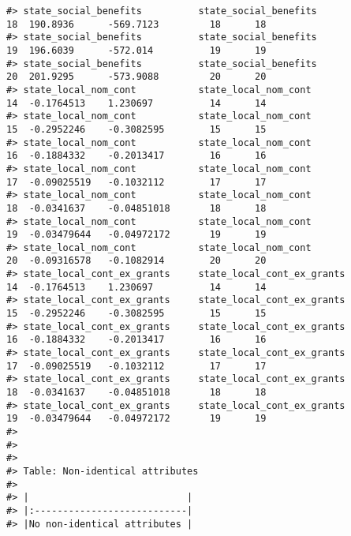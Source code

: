 \documentclass[
]{article}
\begin{document}
\begin{verbatim}
#> state_social_benefits          state_social_benefits                      18  190.8936      -569.7123         18      18
#> state_social_benefits          state_social_benefits                      19  196.6039      -572.014          19      19
#> state_social_benefits          state_social_benefits                      20  201.9295      -573.9088         20      20
#> state_local_nom_cont           state_local_nom_cont                       14  -0.1764513    1.230697          14      14
#> state_local_nom_cont           state_local_nom_cont                       15  -0.2952246    -0.3082595        15      15
#> state_local_nom_cont           state_local_nom_cont                       16  -0.1884332    -0.2013417        16      16
#> state_local_nom_cont           state_local_nom_cont                       17  -0.09025519   -0.1032112        17      17
#> state_local_nom_cont           state_local_nom_cont                       18  -0.0341637    -0.04851018       18      18
#> state_local_nom_cont           state_local_nom_cont                       19  -0.03479644   -0.04972172       19      19
#> state_local_nom_cont           state_local_nom_cont                       20  -0.09316578   -0.1082914        20      20
#> state_local_cont_ex_grants     state_local_cont_ex_grants                 14  -0.1764513    1.230697          14      14
#> state_local_cont_ex_grants     state_local_cont_ex_grants                 15  -0.2952246    -0.3082595        15      15
#> state_local_cont_ex_grants     state_local_cont_ex_grants                 16  -0.1884332    -0.2013417        16      16
#> state_local_cont_ex_grants     state_local_cont_ex_grants                 17  -0.09025519   -0.1032112        17      17
#> state_local_cont_ex_grants     state_local_cont_ex_grants                 18  -0.0341637    -0.04851018       18      18
#> state_local_cont_ex_grants     state_local_cont_ex_grants                 19  -0.03479644   -0.04972172       19      19
#> 
#> 
#> 
#> Table: Non-identical attributes
#> 
#> |                            |
#> |:---------------------------|
#> |No non-identical attributes |
\end{verbatim}
\end{document}
